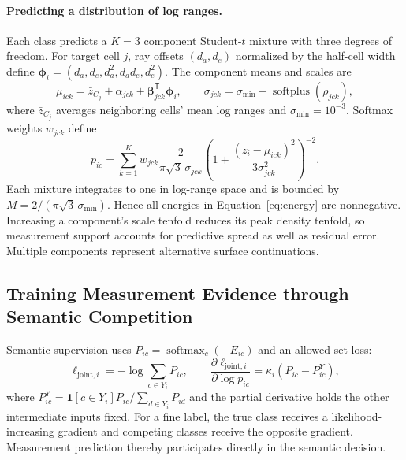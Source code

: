 \documentclass{article}
\newcommand{\ind}{\mathbf{1}}
\begin{document}
\paragraph{Predicting a distribution of log ranges.}
Each class predicts a $K=3$ component Student-$t$ mixture with three degrees of freedom. For target cell $j$, ray offsets $(d_a,d_e)$ normalized by the half-cell width define $\boldsymbol\phi_i=(d_a,d_e,d_a^2,d_ad_e,d_e^2)$. The component means and scales are
\begin{equation}
 \mu_{ick}=\bar z_{C_j}+\alpha_{jck}+\boldsymbol\beta_{jck}^{\mathsf T}\boldsymbol\phi_i,
 \qquad \sigma_{jck}=\sigma_{\min}+\operatorname{softplus}(\rho_{jck}),
 \label{eq:surface}
\end{equation}
where $\bar z_{C_j}$ averages neighboring cells' mean log ranges and $\sigma_{\min}=10^{-3}$. Softmax weights $w_{jck}$ define
\begin{equation}
 p_{ic}=\sum_{k=1}^{K}w_{jck}\frac{2}{\pi\sqrt3\,\sigma_{jck}}
 \left(1+\frac{(z_i-\mu_{ick})^2}{3\sigma_{jck}^2}\right)^{-2}.
 \label{eq:density}
\end{equation}
Each mixture integrates to one in log-range space and is bounded by $M=2/(\pi\sqrt3\,\sigma_{\min})$. Hence all energies in Equation~\eqref{eq:energy} are nonnegative. Increasing a component's scale tenfold reduces its peak density tenfold, so measurement support accounts for predictive spread as well as residual error. Multiple components represent alternative surface continuations.

\subsection{Training Measurement Evidence through Semantic Competition}
Semantic supervision uses $P_{ic}=\operatorname{softmax}_c(-E_{ic})$ and an allowed-set loss:
\begin{equation}
 \ell_{\mathrm{joint},i}=-\log\sum_{c\in Y_i}P_{ic},\qquad
 \frac{\partial\ell_{\mathrm{joint},i}}{\partial\log p_{ic}}
 =\kappa_i(P_{ic}-P^Y_{ic}),
 \label{eq:joint}
\end{equation}
where $P^Y_{ic}=\ind[c\in Y_i]P_{ic}/\sum_{d\in Y_i}P_{id}$ and the partial derivative holds the other intermediate inputs fixed. For a fine label, the true class receives a likelihood-increasing gradient and competing classes receive the opposite gradient. Measurement prediction thereby participates directly in the semantic decision.
\end{document}
